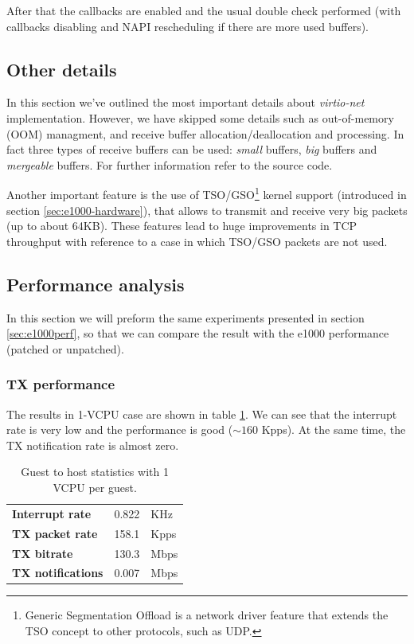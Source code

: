 After that the callbacks are enabled and the usual double check performed (with callbacks disabling and NAPI rescheduling if there are
more used buffers).


\subsection{Other details}
In this section we've outlined the most important details about \emph{virtio-net} implementation. However, we have skipped some details
such as out-of-memory (OOM) managment, and receive buffer allocation/deallocation and processing.
In fact three types of receive buffers can be used: \emph{small} buffers, \emph{big} buffers and \emph{mergeable} buffers. For further
information refer to the source code.

\vspace{0.5cm}

Another important feature is the use of TSO/GSO\footnote{Generic Segmentation Offload is a network driver feature that extends the TSO
concept to other protocols, such as UDP.} kernel support (introduced in section \ref{sec:e1000-hardware}), that allows to transmit
and receive very big packets (up to about 64KB). These features lead to huge improvements in TCP throughput with reference to a case in
which TSO/GSO packets are not used.


\subsection{Performance analysis}
In this section we will preform the same experiments presented in section \ref{sec:e1000perf}, so that we can compare the result with
the e1000 performance (patched or unpatched).

\subsubsection{TX performance}
\label{sec:virtionet-perf-tx}
The results in 1-VCPU case are shown in table \ref{tab:virtionet-tx-g2h1vcpu}. We can see that the interrupt rate is very low and the
performance is good ($\sim 160$ Kpps). At the same time, the TX notification rate is almost zero. 

\begin{table}
\begin{center}
\begin{tabular}{lrl}
\toprule
\textbf{Interrupt rate} & 0.822 & KHz\\
\textbf{TX packet rate} & 158.1 & Kpps\\
\textbf{TX bitrate} & 130.3 & Mbps\\
\textbf{TX notifications} & 0.007 & Mbps\\
\bottomrule
\end{tabular}
\end{center}
\caption{Guest to host statistics with 1 VCPU per guest.}
\label{tab:virtionet-tx-g2h1vcpu}
\end{table}

